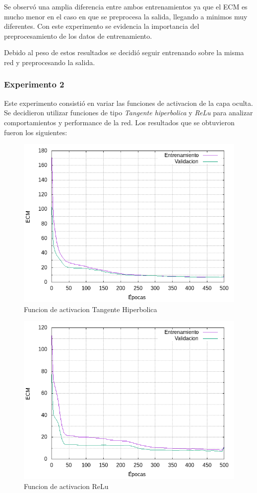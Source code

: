 Se observó una amplia diferencia entre ambos entrenamientos ya que el ECM es mucho menor en el caso en que se preprocesa la salida, llegando
a minimos muy diferentes. Con este experimento se evidencia la importancia del preprocesamiento de los datos de entrenamiento.

Debido al peso de estos resultados se decidió seguir entrenando sobre la misma red y preprocesando la salida.

\subsubsection{Experimento 2}
Este experimento consistió en variar las funciones de activacion de la capa oculta. Se decidieron utilizar funciones de tipo \textit{Tangente hiperbolica} y \textit{ReLu}
para analizar comportamientos y performance de la red. Los resultados que se obtuvieron fueron los siguientes:

\begin{figure}[H]
  \includegraphics[width=125mm]{imagenes/ej2/ex_2-1_red-9-17-2_errors.png}
  \caption{Funcion de activacion Tangente Hiperbolica}
\end{figure}

\begin{figure}[H]
  \includegraphics[width=125mm]{imagenes/ej2/ex_2-2_red-9-17-2_errors.png}
  \caption{Funcion de activacion ReLu}
\end{figure}


